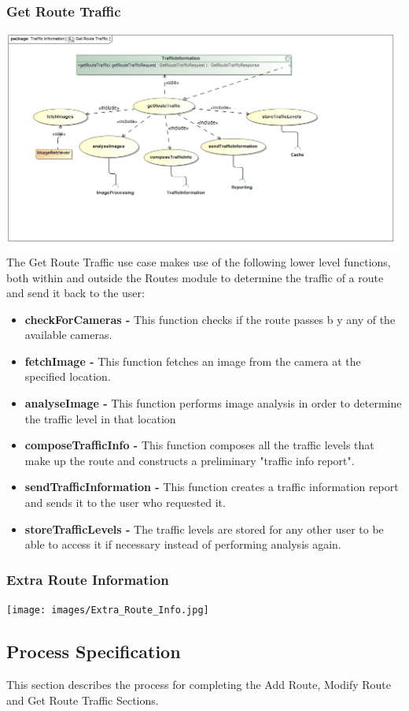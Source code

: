 \documentclass[a4paper,12pt]{article}
\begin{document}
\subsubsection{Get Route Traffic}
\includegraphics[width=\textwidth]{images/Get_Route_Traffic.jpg}
The Get Route Traffic use case makes use of the following lower level functions, both within and outside the Routes module to determine the traffic of a route and send it back to the user:
\begin{itemize}
\item \textbf{checkForCameras -} This function checks if the route passes b y any of the available cameras.
\item \textbf{fetchImage -} This function fetches an image from the camera at the specified location.
\item \textbf{analyseImage -} This function performs image analysis in order to determine the traffic level in that location
\item \textbf{composeTrafficInfo -} This function composes all the traffic levels that make up the route and constructs a preliminary "traffic info report".
\item \textbf{sendTrafficInformation -} This function creates a traffic information report and sends it to the user who requested it.
\item \textbf{storeTrafficLevels -} The traffic levels are stored for any other user to be able to access it if necessary instead of performing analysis again.
\end{itemize}
\subsubsection{Extra Route Information}
\texttt{[image: images/Extra\_Route\_Info.jpg]}

\subsection{Process Specification}
This section describes the process for completing the Add Route, Modify Route and Get Route Traffic Sections.
\end{document}
